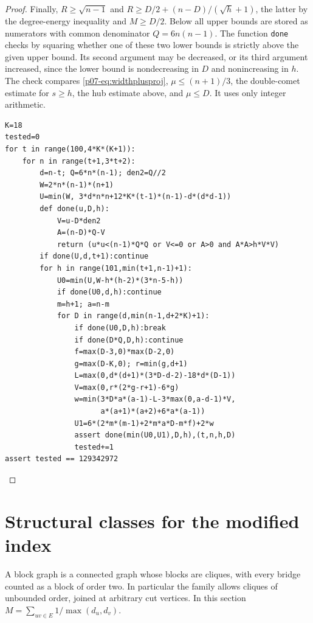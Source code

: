 \documentclass[11pt,a4paper]{article}
\begin{document}
\begin{proof}
Finally, $R\ge\sqrt{n-1}$ and $R\ge D/2+(n-D)/(\sqrt h+1)$, the
latter by the degree-energy inequality and $M\ge D/2$. Below all upper
bounds are stored as numerators with common denominator $Q=6n(n-1)$.
The function \texttt{done} checks by squaring whether one of these two
lower bounds is strictly above the given upper bound. Its second argument
may be decreased, or its third argument increased, since the lower bound
is nondecreasing in $D$ and nonincreasing in $h$. The check compares
\eqref{p07-eq:widthplusproj}, $\mu\le(n+1)/3$, the double-comet estimate for
$s\ge h$, the hub estimate above, and $\mu\le D$. It uses only integer
arithmetic.
\begin{verbatim}
K=18
tested=0
for t in range(100,4*K*(K+1)):
    for n in range(t+1,3*t+2):
        d=n-t; Q=6*n*(n-1); den2=Q//2
        W=2*n*(n-1)*(n+1)
        U=min(W, 3*d*n*n+12*K*(t-1)*(n-1)-d*(d*d-1))
        def done(u,D,h):
            V=u-D*den2
            A=(n-D)*Q-V
            return (u*u<(n-1)*Q*Q or V<=0 or A>0 and A*A>h*V*V)
        if done(U,d,t+1):continue
        for h in range(101,min(t+1,n-1)+1):
            U0=min(U,W-h*(h-2)*(3*n-5-h))
            if done(U0,d,h):continue
            m=h+1; a=n-m
            for D in range(d,min(n-1,d+2*K)+1):
                if done(U0,D,h):break
                if done(D*Q,D,h):continue
                f=max(D-3,0)*max(D-2,0)
                g=max(D-K,0); r=min(g,d+1)
                L=max(0,d*(d+1)*(3*D-d-2)-18*d*(D-1))
                V=max(0,r*(2*g-r+1)-6*g)
                w=min(3*D*a*(a-1)-L-3*max(0,a-d-1)*V,
                      a*(a+1)*(a+2)+6*a*(a-1))
                U1=6*(2*m*(m-1)+2*m*a*D-m*f)+2*w
                assert done(min(U0,U1),D,h),(t,n,h,D)
                tested+=1
assert tested == 129342972
\end{verbatim}
\end{proof}
\section{Structural classes for the modified index}
A block graph is a connected graph whose blocks are cliques, with every
bridge counted as a block of order two. In particular the family allows
cliques of unbounded order, joined at arbitrary cut vertices. In this
section $M=\sum_{uv\in E}1/\max(d_u,d_v)$.
\end{document}
